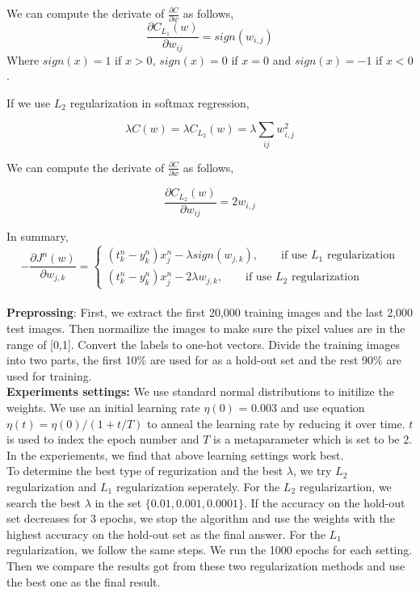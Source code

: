 \documentclass{article} %
\begin{document}
We can compute the derivate of $\frac{\partial C}{\partial w}$ as follows,
\begin{equation}
	\frac{\partial C_{L_1}(w)}{\partial w_{ij}} = sign(w_{i,j})
\end{equation}
Where $sign(x) = 1$ if $x > 0$, $sign(x) = 0$ if $x = 0$ and $sign(x) = -1$ if $x < 0$.

If we use $L_2$ regularization in softmax regression,

\begin{equation}
\lambda C(w) = \lambda C_{L_2}(w) =   \lambda \sum_{ij}w_{i,j}^2
\end{equation}

We can compute the derivate of $\frac{\partial C}{\partial w}$ as follows,

\begin{equation}
\frac{\partial C_{L_2}(w)}{\partial w_{ij}} = 2w_{i,j}
\end{equation}

In summary, 
  \[
-\frac{\partial J^n(w)}{\partial w_{j,k}} =\left\{
\begin{array}{ll}
(t^n_k - y^n_k)x_j^n - \lambda sign(w_{j,k}),\qquad \text{if use $L_1$ regularization} \\
(t^n_k - y^n_k)x_j^n - 2\lambda w_{j,k}, \qquad \text{if use $L_2$ regularization}
\end{array}
\right.
\]
\\

\textbf{Preprossing}: First, we extract the first 20,000 training images and the last 2,000 test images. Then normailize the images to make sure the pixel values are in the range of [0,1]. Convert the labels to one-hot vectors. Divide the training images into two parts, the first 10\% are used for as a hold-out set and the rest 90\% are used for training.
\\

\textbf{Experiments settings:} We use standard normal distributions to initilize the weights. We use an initial learning rate $\eta({0})$ = 0.003 and use equation $\eta({t}) = \eta{(0)}/(1+t/T)$ to anneal the learning rate by reducing it over time. $t$ is used to index the epoch number and $T$ is a metaparameter which is set to be 2. In the
experiements, we find that above learning settings work best.
\\

To determine the best type of regurization and the best $\lambda$, we try $L_2$ regularization and $L_1$ regularization seperately. For the $L_2$ regularizartion, we search the best $\lambda$ in the set $\{0.01, 0.001, 0.0001\}$. If the accuracy on the hold-out set decreases for 3 epochs, we stop the algorithm and use the weights with the highest accuracy on the hold-out set as the final answer. For the $L_1$ regularization, we follow the same steps. We run the 1000 epochs for each setting. \textbf{}Then we compare the results got from these two regularization methods and use the best one as the final result.
 
\end{document}
